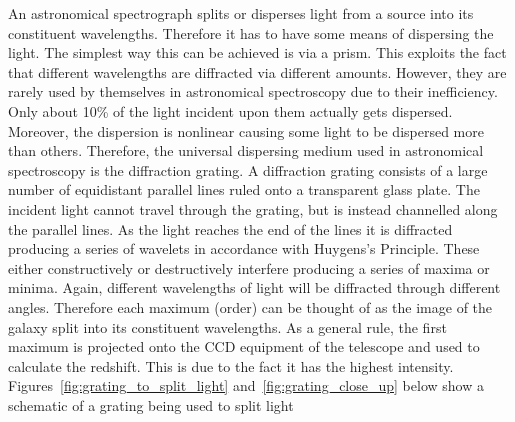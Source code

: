 	An astronomical spectrograph splits or disperses light from a source into its constituent wavelengths. Therefore it has to have some means of dispersing the light. The simplest way this can be achieved is via a prism. This exploits the fact that different wavelengths are diffracted via different amounts. However, they are rarely used by themselves in astronomical spectroscopy due to their inefficiency. Only about 10\% of the light incident upon them actually gets dispersed. Moreover, the dispersion is nonlinear causing some light to be dispersed more than others. Therefore, the universal dispersing medium used in astronomical spectroscopy is the diffraction grating. A diffraction grating consists of a large number of equidistant parallel lines ruled onto a transparent glass plate. The incident light cannot travel through the grating, but is instead channelled along the parallel lines. As the light reaches the end of the lines it is diffracted producing a series of wavelets in accordance with Huygens’s Principle. These either constructively or destructively interfere producing a series of maxima or minima. Again, different wavelengths of light will be diffracted through different angles. Therefore each maximum (order) can be thought of as the image of the galaxy split into its constituent wavelengths. As a general rule, the first maximum is projected onto the CCD equipment of the telescope and used to calculate the redshift. This is due to the fact it has the highest intensity. Figures~\ref{fig:grating_to_split_light} and~\ref{fig:grating_close_up} below show a schematic of a grating being used to split light

